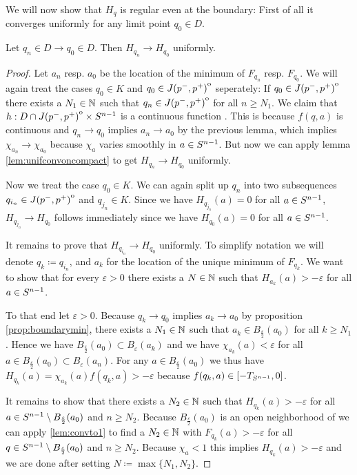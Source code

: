 We will now show that $H_q$ is regular even at the boundary:
First of all it converges uniformly for any limit point $q_0\in D$.
\begin{proposition}\label{prop:hunif}
    Let $q_n\in D\to q_0\in D$. Then $H_{q_n}\to H_{q_0}$ uniformly.
\end{proposition}
\begin{proof}
    Let $a_n$ resp. $a_0$ be the location of the minimum of $F_{q_n}$ resp. $F_{q_0}$.
    We will again treat the cases $q_0\in K$ and $q_0\in {\kern0ptJ(p^-,p^+)}^{\mathrm{o}}$ seperately:
    If $q_0\in {\kern0ptJ(p^-,p^+)}^{\mathrm{o}}$ there exists a $N_1\in \mathbb{N}$ such that $q_n \in {\kern0ptJ(p^-,p^+)}^{\mathrm{o}}$ for all $n\ge N_1$. We claim that $h:D\cap {\kern0ptJ(p^-,p^+)}^{\mathrm{o}}\times {S^{n-1}}$ is a continuous function . This is because $f(q,a)$ is continuous and $q_n\to q_0$ implies $a_n\to a_0$ by the previous lemma, which implies $\chi_{a_n}\to \chi_{a_0}$ because $\chi_a$ varies smoothly in $a\in {S^{n-1}}$. But now we can apply lemma \ref{lem:unifconvoncompact} to get $H_{q_n}\to H_{q_0}$ uniformly.

    Now we treat the case $q_0\in K$. We can again split up $q_n$ into two subsequences $q_{i_n}\in {\kern0ptJ(p^-,p^+)}^{\mathrm{o}}$ and $q_{j_n}\in K$. Since we have $H_{q_{j_n}}(a)=0$ for all $a\in {S^{n-1}}$, $H_{q_{j_n}}\to H_{q_0}$ follows immediately since we have $H_{q_0}(a)=0$ for all $a\in {S^{n-1}}$.

    It remains to prove that $H_{q_{i_n}}\to H_{q_0}$ uniformly. To simplify notation we will denote $q_k\coloneqq q_{i_n}$, and $a_k$ for the location of the unique minimum of $F_{q_k}$. We want to show that for every $\varepsilon>0$ there exists a $N\in \mathbb{N}$ such that $H_{a_k}(a)>-\varepsilon$ for all $a\in {S^{n-1}}$.

    To that end let $\varepsilon>0$. Because $q_k\to q_0$ implies $a_k\to a_0$ by proposition \ref{prop:boundarymin}, there exists a $N_1\in \mathbb{N}$ such that $a_k\in B_\frac{\varepsilon}{2}(a_0)$ for all $k\ge N_1$. Hence we have $B_\frac{\varepsilon}{2}(a_0)\subset B_\varepsilon(a_k)$ and we have $\chi_{a_k}(a)<\varepsilon$ for all $a\in B_\frac{\varepsilon}{2}(a_0)\subset B_\varepsilon(a_n)$.
    For any $a\in B_\frac{\varepsilon}{2}(a_0)$ we thus have $H_{q_k}(a) = \chi_{a_k}(a)f(q_k,a) > -\varepsilon$ because $f(q_k,a)\in [-T_{S^{n-1}},0]$.

    It remains to show that there exists a $N_2\in \mathbb{N}$ such that $H_{q_k}(a) > -\varepsilon$ for all $a\in {S^{n-1}}\setminus B_\frac{\varepsilon}{2}(a_0)$ and $n\ge N_2$. Because $B_\frac{\varepsilon}{2}(a_0)$ is an open neighborhood of we can apply \ref{lem:convto1} to find a $N_2\in \mathbb{N}$ with $F_{q_k}(a) > -\varepsilon$ for all $q\in {S^{n-1}} \setminus B_\frac{\varepsilon}{2}(a_0)$ and $n \ge N_2$. Because $\chi_{a}<1$ this implies $H_{q_k}(a) > -\varepsilon$ and we are done after setting $N\coloneqq  \max \{N_1,N_2\}$.
\end{proof}

